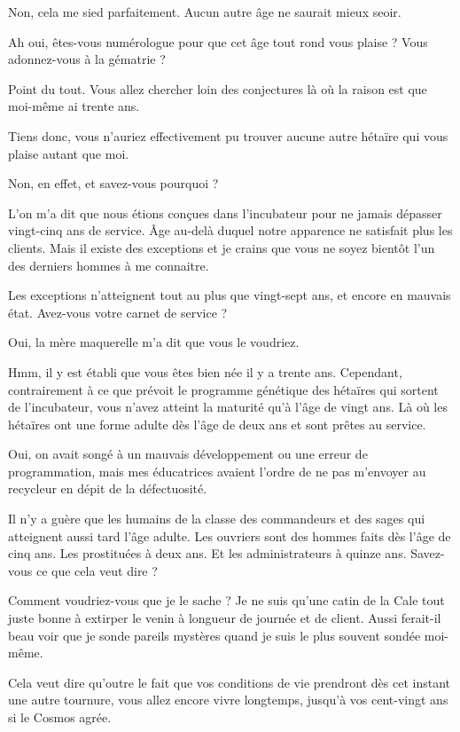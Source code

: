 \begin{drama}
  \elenaspeaks Non, cela me sied parfaitement. Aucun autre âge ne saurait mieux seoir.

  \elaspeaks Ah oui, êtes-vous numérologue pour que cet âge tout rond vous plaise ? Vous adonnez-vous à la gématrie ?

  \elenaspeaks {} Point du tout. Vous allez chercher loin des conjectures là où la raison est que moi-même ai trente ans.

  \elaspeaks Tiens donc, vous n’auriez effectivement pu trouver aucune autre hétaïre qui vous plaise autant que moi.

  \elenaspeaks Non, en effet, et savez-vous pourquoi ?

  \elaspeaks L’on m’a dit que nous étions conçues dans l’incubateur pour ne jamais dépasser vingt-cinq ans de service. Âge au-delà duquel notre apparence ne satisfait plus les clients. Mais il existe des exceptions et je crains que vous ne soyez bientôt l’un des derniers hommes à me connaitre.

  \elenaspeaks Les exceptions n’atteignent tout au plus que vingt-sept ans, et encore en mauvais état. Avez-vous votre carnet de service ?

  \elaspeaks Oui, la mère maquerelle m’a dit que vous le voudriez.

  \elenaspeaks {} Hmm, il y est établi que vous êtes bien née il y a trente ans. Cependant, contrairement à ce que prévoit le programme génétique des hétaïres qui sortent de l’incubateur, vous n’avez atteint la maturité qu’à l’âge de vingt ans. Là où les hétaïres ont une forme adulte dès l’âge de deux ans et sont prêtes au service.

  \elaspeaks Oui, on avait songé à un mauvais développement ou une erreur de programmation, mais mes éducatrices avaient l’ordre de ne pas m’envoyer au recycleur en dépit de la défectuosité.

  \elenaspeaks Il n’y a guère que les humains de la classe des commandeurs et des sages qui atteignent aussi tard l’âge adulte. Les ouvriers sont des hommes faits dès l’âge de cinq ans. Les prostituées à deux ans. Et les administrateurs à quinze ans. Savez-vous ce que cela veut dire ?

  \elaspeaks Comment voudriez-vous que je le sache ? Je ne suis qu’une catin de la Cale tout juste bonne à extirper le venin à longueur de journée et de client. Aussi ferait-il beau voir que je sonde pareils mystères quand je suis le plus souvent sondée moi-même.

  \elenaspeaks Cela veut dire qu’outre le fait que vos conditions de vie prendront dès cet instant une autre tournure, vous allez encore vivre longtemps, jusqu’à vos cent-vingt ans si le Cosmos agrée.

\end{drama}


